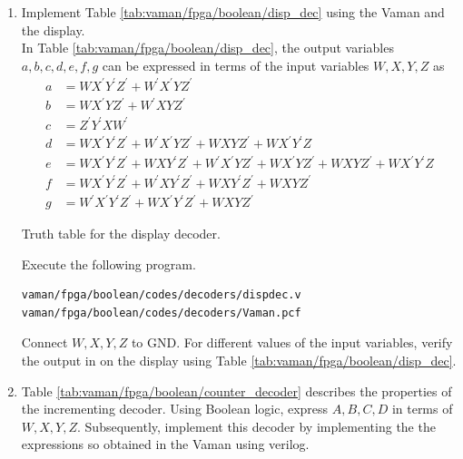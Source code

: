 \documentclass[journal,12pt,twocolumn]{IEEEtran}
\renewcommand\thesection{\arabic{section}}
\renewcommand\thesubsection{\thesection.\arabic{subsection}}
\begin{document}
\begin{enumerate}[label=\thesubsection.\arabic*.,ref=\thesubsection.\theenumi]
\item Implement  Table \ref{tab:vaman/fpga/boolean/disp_dec} using the Vaman and the display.
\\
\solution In Table \ref{tab:vaman/fpga/boolean/disp_dec}, the output variables   $a,b,c,d,e,f,g$ can be expressed
in terms of the input variables $W,X,Y,Z$ as
%
\begin{align}
\label{eq:vaman/fpga/boolean/disp_a}
a &= WX^{\prime}Y^{\prime}Z^{\prime}+W^{\prime}X^{\prime}YZ^{\prime}
\\
\label{eq:vaman/fpga/boolean/disp_b}
b &= WX^{\prime}YZ^{\prime}+W^{\prime}XYZ^{\prime}
\\
\label{eq:vaman/fpga/boolean/disp_c}
c &= {Z}^{\prime}{Y}^{\prime}X{W}^{\prime}
\\
d &= WX^{\prime}Y^{\prime}Z^{\prime}+W^{\prime}X^{\prime}YZ^{\prime}+WXYZ^{\prime}+WX^{\prime}Y^{\prime}Z
\label{eq:vaman/fpga/boolean/disp_d}
\\
e &= WX^{\prime}Y^{\prime}Z^{\prime}+WXY^{\prime}Z^{\prime}+W^{\prime}X^{\prime}YZ^{\prime}+WX^{\prime}YZ^{\prime}
	+WXYZ^{\prime}+WX^{\prime}Y^{\prime}Z
\label{eq:vaman/fpga/boolean/disp_e}
\\
f &= WX^{\prime}Y^{\prime}Z^{\prime}+W^{\prime}XY^{\prime}Z^{\prime}+WXY^{\prime}Z^{\prime}+WXYZ^{\prime}
\label{eq:vaman/fpga/boolean/disp_f}
\\
g &= W^{\prime}X^{\prime}Y^{\prime}Z^{\prime}+WX^{\prime}Y^{\prime}Z^{\prime}+WXYZ^{\prime}
\label{eq:vaman/fpga/boolean/disp_g}
\end{align}
\begin{table}
\centering

\caption{Truth table for the display decoder.}
\label{tab:vaman/fpga/boolean/disp_dec}
\end{table}
%
Execute the following program.
\begin{lstlisting}
vaman/fpga/boolean/codes/decoders/dispdec.v
vaman/fpga/boolean/codes/decoders/Vaman.pcf
\end{lstlisting}
Connect $W, X, Y, Z$ to GND.  For different values of the input variables, verify the output
in on the display using Table \ref{tab:vaman/fpga/boolean/disp_dec}.
\item Table  \ref{tab:vaman/fpga/boolean/counter_decoder} describes the properties of the incrementing decoder.
Using Boolean logic, express $A,B,C,D$ in terms of  $W,X,Y,Z$.  Subsequently, implement this decoder by implementing the the expressions so obtained in the Vaman using verilog.

\end{enumerate}
\end{document}
